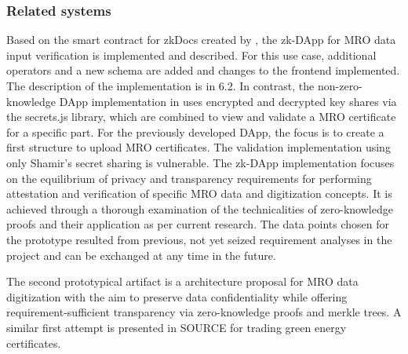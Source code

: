 \subsubsection{Related systems}
Based on the smart contract for zkDocs created by \citep{zkdocs}, the zk-DApp for MRO data input verification is implemented and described. For this use case, additional operators and a new schema are added and changes to the frontend implemented. The description of the implementation is in 6.2. In contrast, the non-zero-knowledge DApp implementation in \citet{semesterproject} uses encrypted and decrypted key shares via the secrets.js library, which are combined to view and validate a MRO certificate for a specific part. For the previously developed DApp, the focus is to create a first structure to upload MRO certificates. The validation implementation using only Shamir's secret sharing is vulnerable. The zk-DApp implementation focuses on the equilibrium of privacy and transparency requirements for performing attestation and verification of specific MRO data and digitization concepts. It is achieved through a thorough examination of the technicalities of zero-knowledge proofs and their application as per current research. The data points chosen for the prototype resulted from previous, not yet seized requirement analyses in the project and can be exchanged at any time in the future. 

The second prototypical artifact is a architecture proposal for MRO data digitization with the aim to preserve data confidentiality while offering requirement-sufficient transparency via zero-knowledge proofs and merkle trees. A similar first attempt is presented in SOURCE for trading green energy certificates. 
